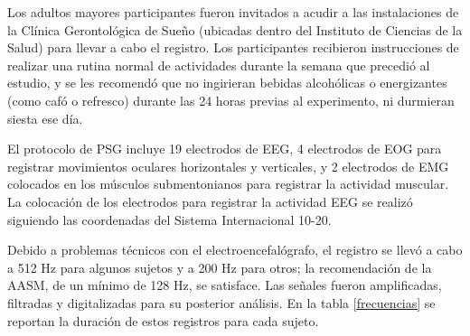 \documentclass[12pt,a4paper]{mitthesis}
\begin{document}
Los adultos mayores participantes fueron invitados a acudir a las instalaciones de la Cl\'inica 
Gerontol\'ogica de Sue\~no (ubicadas dentro del Instituto de Ciencias de la Salud) para llevar a 
cabo el registro. Los participantes recibieron instrucciones de realizar una rutina normal de 
actividades durante la semana que precedi\'o al estudio, y se les recomend\'o que no ingirieran 
bebidas alcoh\'olicas o energizantes (como caf\'o o refresco) durante las 24 horas previas al 
experimento, ni durmieran siesta ese d\'ia.

El protocolo de PSG incluye 19 electrodos de EEG, 4 electrodos de EOG para registrar movimientos 
oculares horizontales y verticales, y 2 electrodos de EMG colocados en los m\'usculos 
submentonianos para registrar la actividad muscular. 
La colocaci\'on de los electrodos para registrar la actividad EEG se realiz\'o siguiendo las 
coordenadas del Sistema Internacional 10-20\cite{Coleman87}.


Debido a problemas t\'ecnicos con el electroencefal\'ografo, el registro se llev\'o a cabo a 512 Hz 
para algunos sujetos y a 200 Hz para otros; la recomendaci\'on de la AASM, de un m\'inimo de 128 
Hz, se satisface. 
Las se\~nales fueron amplificadas, filtradas y digitalizadas para su posterior an\'alisis.
En la tabla \ref{frecuencias} se reportan la duraci\'on de estos registros para cada sujeto.
\end{document}
